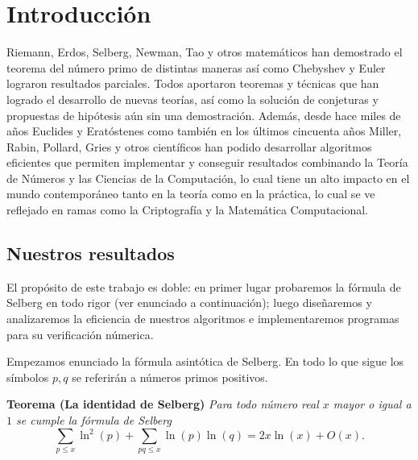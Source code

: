 \setlength{\headheight}{14.61858pt}
\pagestyle{fancy}

\chapter[Introducci\'on]
{Introducci\'on}
\label{Chapter01}

\vspace*{1cm}

Riemann, Erdos, Selberg, Newman, Tao y otros matem\'aticos han demostrado el
teorema del n\'umero primo de distintas maneras as\'i como Chebyshev y Euler
lograron resultados parciales.
Todos aportaron teoremas y t\'ecnicas que han
logrado el desarrollo de nuevas teor\'ias, as\'i como la soluci\'on
de conjeturas y propuestas de hip\'otesis a\'un sin una demostraci\'on.
Adem\'as, desde hace miles de a\~nos Euclides y Erat\'ostenes
como tambi\'en en los \'ultimos cincuenta a\~nos Miller, Rabin, Pollard, Gries
y otros cient\'ificos han podido desarrollar algoritmos eficientes que permiten
implementar y conseguir resultados combinando la Teor\'ia de N\'umeros y
las Ciencias de la Computaci\'on, lo cual tiene un alto impacto en
el mundo contempor\'aneo tanto en la teor\'ia como en la pr\'actica,
lo cual se ve reflejado en ramas como la Criptograf\'ia y
la Matem\'atica Computacional.
 
\section{Nuestros resultados}
El prop\'osito de este trabajo es doble: 
en primer lugar probaremos la f\'ormula de Selberg en todo rigor
(ver enunciado a continuaci\'on); 
luego diseñaremos y analizaremos la eficiencia de nuestros algoritmos e
implementaremos programas para su verificaci\'on n\'umerica.

\bigskip

Empezamos enunciado la f\'ormula asint\'otica de Selberg. 
En todo lo que sigue los s\'imbolos \(p, q\) se referir\'an a
n\'umeros primos positivos.

\bigskip

\noindent
\textbf{Teorema (La identidad de Selberg)}
\textit{Para todo n\'umero real \(x\) mayor o igual a \(1\)
se cumple la f\'ormula de Selberg}
\[
  \sum_{p \leq x} \ln^2(p) + \sum_{pq \leq x} \ln(p) \ln(q) = 2x\ln(x) + O(x).
\]

